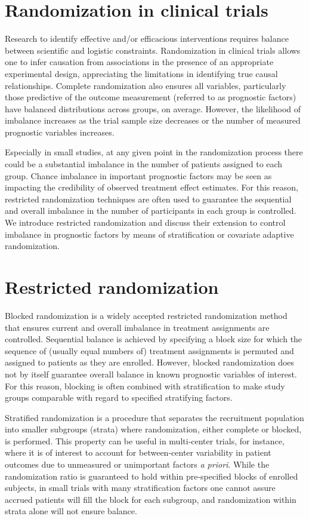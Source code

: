 \section[Randomization in RCTs]{Randomization in clinical trials}
Research to identify effective and/or efficacious interventions requires balance between scientific and logistic constraints. 
Randomization in clinical trials allows one to infer causation from associations in the presence of an appropriate experimental design, appreciating the limitations in identifying true causal relationships. 
Complete randomization also ensures all variables, particularly those predictive of the outcome measurement (referred to as prognostic factors) have balanced distributions across groups, on average. 
However, the likelihood of imbalance increases as the trial sample size decreases or the number of measured prognostic variables increases.  

Especially in small studies, at any given point in the randomization process there could be a substantial imbalance in the number of patients assigned to each group.  
Chance imbalance in important prognostic factors may be seen as impacting the credibility of observed treatment effect estimates. 
For this reason, restricted randomization techniques are often used to guarantee the sequential and overall imbalance in the number of participants in each group is controlled.
We introduce restricted randomization and discuss their extension to control imbalance in prognostic factors by means of stratification or covariate adaptive randomization.

\section{Restricted randomization}
Blocked randomization is a widely accepted restricted randomization method that ensures current and overall imbalance in treatment assignments are controlled.  
Sequential balance is achieved by specifying a block size for which the sequence of (usually equal numbers of) treatment assignments is permuted and assigned to patients as they are enrolled. 
However, blocked randomization does not by itself guarantee overall balance in known prognostic variables of interest.  
For this reason, blocking is often combined with stratification to make study groups comparable with regard to specified stratifying factors.  

Stratified randomization is a procedure that separates the recruitment population into smaller subgroups (strata) where randomization, either complete or blocked, is performed.  
This property can be useful in multi-center trials, for instance, where it is of interest to account for between-center variability in patient outcomes due to unmeasured or unimportant factors \textit{a priori}. 
While the randomization ratio is guaranteed to hold within pre-specified blocks of enrolled subjects, in small trials with many stratification factors one cannot assure accrued patients will fill the block for each subgroup, and randomization within strata alone will not ensure balance.  

